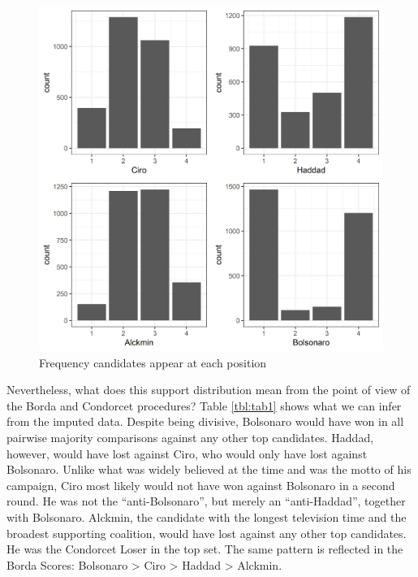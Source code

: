 \documentclass[hidelinks,11pt]{article}
\begin{document}
\begin{figure}[H]
 \centering
 \includegraphics[width=0.8\columnwidth,
 height=0.5\textheight]{./images/corrected1_indexes_plot.png}
 \caption{Frequency candidates appear at each position}
 \label{fig:counts}
\end{figure}

Nevertheless, what does this support distribution mean from the point of view of the Borda and Condorcet procedures? Table \ref{tbl:tab1} shows what we can infer from the imputed data. Despite being divisive, Bolsonaro would have won in all pairwise majority comparisons against any other top candidates. Haddad, however, would have lost against Ciro, who would only have lost against Bolsonaro. Unlike what was widely believed at the time and was the motto of his campaign, Ciro most likely would not have won against Bolsonaro in a second round. He was not the ``anti-Bolsonaro'', but merely an ``anti-Haddad'', together with Bolsonaro. Alckmin, the candidate with the longest television time and the broadest supporting coalition, would have lost against any other top candidates. He was the Condorcet Loser in the top set. The same pattern is reflected in the Borda Scores: Bolsonaro > Ciro > Haddad > Alckmin.
\end{document}
